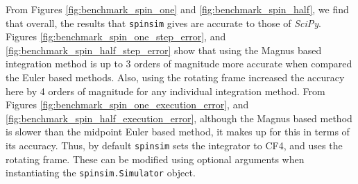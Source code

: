 \documentclass{jors}
\begin{document}
		From Figures \ref{fig:benchmark_spin_one} and \ref{fig:benchmark_spin_half}, we find that overall, the results that \texttt{spinsim} gives are accurate to those of \emph{SciPy}. Figures \ref{fig:benchmark_spin_one_step_error}, and \ref{fig:benchmark_spin_half_step_error} show that using the Magnus based integration method is up to 3 orders of magnitude more accurate when compared the Euler based methods. Also, using the rotating frame increased the accuracy here by 4 orders of magnitude for any individual integration method. From Figures \ref{fig:benchmark_spin_one_execution_error}, and \ref{fig:benchmark_spin_half_execution_error}, although the Magnus based method is slower than the midpoint Euler based method, it makes up for this in terms of its accuracy. Thus, by default \texttt{spinsim} sets the integrator to CF4, and uses the rotating frame. These can be modified using optional arguments when instantiating the \texttt{spinsim.Simulator} object.
\end{document}
